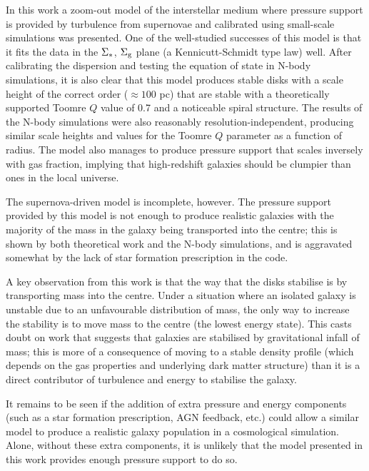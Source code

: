In this work a zoom-out model of the interstellar medium where pressure support is provided by turbulence from supernovae and calibrated using small-scale simulations \citep{martizzi_supernova_2015} was presented.
One of the well-studied successes of this model is that it fits the data in the $\Sigma_*$, $\Sigma_\mathrm{g}$ plane (a Kennicutt-Schmidt type law) well.
After calibrating the dispersion and testing the equation of state in N-body simulations, it is also clear that this model produces stable disks with a scale height of the correct order ($\approx 100$ pc) that are stable with a theoretically supported Toomre $Q$ value of 0.7 and a noticeable spiral structure.
The results of the N-body simulations were also reasonably resolution-independent, producing similar scale heights and values for the Toomre $Q$ parameter as a function of radius.
The model also manages to produce pressure support that scales inversely with gas fraction, implying that high-redshift galaxies should be clumpier than ones in the local universe.

The supernova-driven model is incomplete, however.
The pressure support provided by this model is not enough to produce realistic galaxies with the majority of the mass in the galaxy being transported into the centre; this is shown by both theoretical work and the N-body simulations, and is aggravated somewhat by the lack of star formation prescription in the code.

A key observation from this work is that the way that the disks stabilise is by transporting mass into the centre.
Under a situation where an isolated galaxy is unstable due to an unfavourable distribution of mass, the only way to increase the stability is to move mass to the centre (the lowest energy state).
This casts doubt on work that suggests that galaxies are stabilised by gravitational infall of mass; this is more of a consequence of moving to a stable density profile (which depends on the gas properties and underlying dark matter structure) than it is a direct contributor of turbulence and energy to stabilise the galaxy.

It remains to be seen if the addition of extra pressure and energy components (such as a star formation prescription, AGN feedback, etc.) could allow a similar model to produce a realistic galaxy population in a cosmological simulation.
Alone, without these extra components, it is unlikely that the model presented in this work provides enough pressure support to do so.
